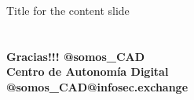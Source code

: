 \documentclass[aspectratio=169]{beamer}
\begin{document}
    \frame{\titlepage}
    
    \begin{frame}{Title for the content slide}
        \tableofcontents
    \end{frame}

    



    \section{}
    \begin{frame}{}
        \centering
            \Huge\bfseries
            \textcolor{yellowCAD}{Gracias!!!}
            \vspace{1cm}
            \huge
            \textcolor{twitter}{\faTwitter } @somos\_CAD \\
            \textcolor{youtube}{\faYoutube } Centro de Autonomía Digital \\
            \textcolor{mastodon}{\faMastodon } @somos\_CAD@infosec.exchange \\
    \end{frame}
\end{document}
